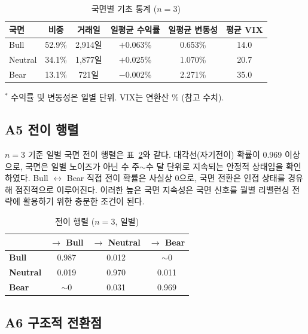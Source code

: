 \documentclass{article}
\begin{document}
\begin{table}[ht]
\centering
\caption{국면별 기초 통계 ($n=3$)}
\label{tab:a1_stats}
\begin{tabular}{lccccc}
\toprule
\textbf{국면} & \textbf{비중} & \textbf{거래일} & \textbf{일평균 수익률} & \textbf{일평균 변동성} & \textbf{평균 VIX} \\
\midrule
Bull    & 52.9\% & 2,914일 & $+$0.063\% & 0.653\% & 14.0 \\
Neutral & 34.1\% & 1,877일 & $+$0.025\% & 1.070\% & 20.7 \\
Bear    & 13.1\% &   721일 & $-$0.002\% & 2.271\% & 35.0 \\
\bottomrule
\end{tabular}
\begin{flushleft}
{\small $^*$ 수익률 및 변동성은 일별 단위. VIX는 연환산 \% (참고 수치).}
\end{flushleft}
\end{table}

\subsection*{A5 전이 행렬}

$n = 3$ 기준 일별 국면 전이 행렬은 표~\ref{tab:a1_trans}와 같다. 대각선(자기전이) 확률이 0.969 이상으로, 국면은 일별 노이즈가 아닌 수 주$\sim$수 달 단위로 지속되는 안정적 상태임을 확인하였다. Bull $\leftrightarrow$ Bear 직접 전이 확률은 사실상 0으로, 국면 전환은 인접 상태를 경유해 점진적으로 이루어진다. 이러한 높은 국면 지속성은 국면 신호를 월별 리밸런싱 전략에 활용하기 위한 충분한 조건이 된다.

\begin{table}[ht]
\centering
\caption{전이 행렬 ($n=3$, 일별)}
\label{tab:a1_trans}
\begin{tabular}{lccc}
\toprule
 & \textbf{$\rightarrow$ Bull} & \textbf{$\rightarrow$ Neutral} & \textbf{$\rightarrow$ Bear} \\
\midrule
\textbf{Bull}    & 0.987 & 0.012 & $\sim$0 \\
\textbf{Neutral} & 0.019 & 0.970 & 0.011 \\
\textbf{Bear}    & $\sim$0 & 0.031 & 0.969 \\
\bottomrule
\end{tabular}
\end{table}

\subsection*{A6 구조적 전환점}
\end{document}
